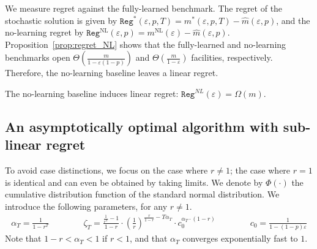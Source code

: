 \documentclass[blindrev]{informs3noheader}
\begin{document}
We measure regret against the fully-learned benchmark. The regret of the stochastic solution is given by $\texttt{Reg}^*(\varepsilon, p,T)=m^*(\varepsilon, p,T)-\widehat{m}(\varepsilon,p)$, and the no-learning regret by $\texttt{Reg}^{\text{NL}}(\varepsilon,p)=m^{\text{NL}}(\varepsilon)-\widehat{m}(\varepsilon,p)$. Proposition~\ref{prop:regret_NL} shows that the fully-learned and no-learning benchmarks open $\Theta\left(\frac{m}{1-\varepsilon(1-p)}\right)$ and $\Theta\left(\frac{m}{1-\varepsilon}\right)$ facilities, respectively. Therefore, the no-learning baseline leaves a linear regret.

\begin{proposition}\label{prop:regret_NL}
The no-learning baseline induces linear regret: $\texttt{Reg}^{NL}(\varepsilon)=\Omega(m)$.
\end{proposition}

\subsection{An asymptotically optimal algorithm with sub-linear regret}

To avoid case distinctions, we focus on the case where $r\neq1$; the case where $r=1$ is identical and can even be obtained by taking limits. We denote by $\Phi(\cdot)$ the cumulative distribution function of the standard normal distribution. We introduce the following parameters, for any $r\neq1$.
\begin{align*}
\alpha_T=\frac{1}{1-r^T}\qquad\qquad
\zeta_T=\frac{\frac{1}{r^T}-1}{1-r}\cdot\left(\frac{1}{r}\right)^{\frac{r}{1-r}-T\alpha_T}\cdot c_0^{\alpha_T\cdot(1-r)} \qquad\qquad c_0 = \frac{1}{1-(1-p)\varepsilon}
\end{align*}
Note that $1-r<\alpha_T<1$ if $r<1$, and that $\alpha_T$ converges exponentially fast to $1$.
\end{document}
